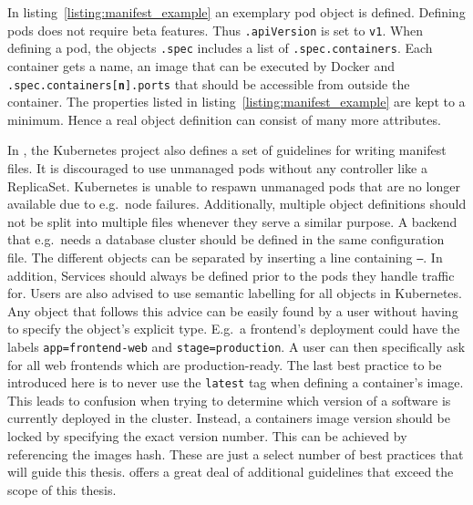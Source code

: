 In listing~\ref{listing:manifest_example} an exemplary pod object is defined.
Defining pods does not require beta features. Thus \texttt{.apiVersion} is set
to \texttt{v1}. When defining a pod, the objects \texttt{.spec} includes a list
of \texttt{.spec.containers}. Each container gets a name, an image that can be
executed by Docker and \texttt{.spec.containers[\textbf{n}].ports} that should
be accessible from outside the container. The properties listed in
listing~\ref{listing:manifest_example} are kept to a minimum. Hence a real
object definition can consist of many more attributes.

In \autocite{AuthorsConfigurationBestPractices2019}, the Kubernetes project
also defines a set of guidelines for writing manifest files. It is discouraged
to use unmanaged pods without any controller like a ReplicaSet. Kubernetes is
unable to respawn unmanaged pods that are no longer available due to e.g.\ node
failures. Additionally, multiple object definitions should not be split into
multiple files whenever they serve a similar purpose. A backend that e.g.\
needs a database cluster should be defined in the same configuration file. The
different objects can be separated by inserting a line containing \texttt{---}.
In addition, Services should always be defined prior to the pods they handle
traffic for. Users are also advised to use semantic labelling for all objects
in Kubernetes. Any object that follows this advice can be easily found by a
user without having to specify the object's explicit type. E.g.\ a frontend's
deployment could have the labels \texttt{app=frontend-web} and
\texttt{stage=production}. A user can then specifically ask for all web
frontends which are production-ready. The last best practice to be introduced
here is to never use the \texttt{latest} tag when defining a container's image.
This leads to confusion when trying to determine which version of a software is
currently deployed in the cluster. Instead, a containers image version should
be locked by specifying the exact version number. This can be achieved by
referencing the images hash. These are just a select number of best practices
that will guide this thesis. \autocite{AuthorsConfigurationBestPractices2019}
offers a great deal of additional guidelines that exceed the scope of this
thesis.
